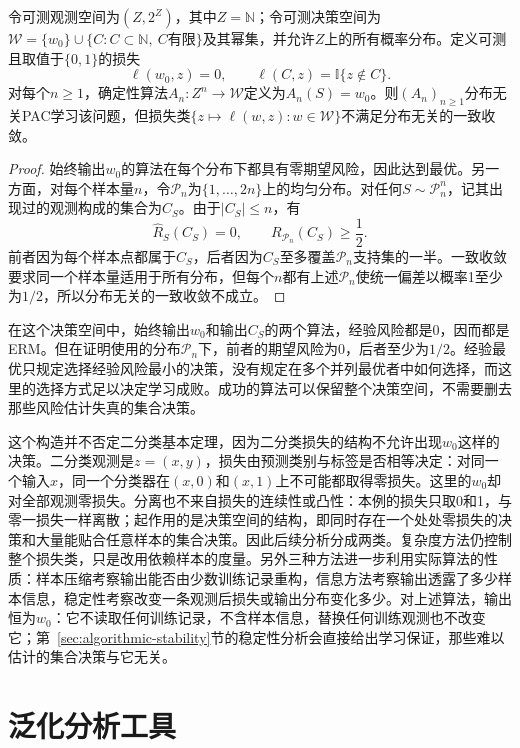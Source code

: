 \begin{theorem}[可学习性不推出一致收敛]
\label{thm:general-learning-without-uniform}
令可测观测空间为$(Z,2^Z)$，其中$Z=\mathbb N$；令可测决策空间为$\mathcal W=\{w_0\}\cup\{C:C\subset\mathbb N,\ C\text{有限}\}$及其幂集，并允许$Z$上的所有概率分布。定义可测且取值于$\{0,1\}$的损失
\[
 \ell(w_0,z)=0,\qquad
 \ell(C,z)=\mathbb I\{z\notin C\}.
\]
对每个$n\geq1$，确定性算法$A_n:Z^n\to\mathcal W$定义为$A_n(S)=w_0$。则$(A_n)_{n\geq1}$分布无关PAC学习该问题，但损失类$\{z\mapsto\ell(w,z):w\in\mathcal W\}$不满足分布无关的一致收敛。
\end{theorem}
\begin{proof}
始终输出$w_0$的算法在每个分布下都具有零期望风险，因此达到最优。另一方面，对每个样本量$n$，令$\mathcal P_n$为$\{1,\ldots,2n\}$上的均匀分布。对任何$S\sim\mathcal P_n^n$，记其出现过的观测构成的集合为$C_S$。由于$|C_S|\leq n$，有
\[
 \hat R_S(C_S)=0,\qquad R_{\mathcal P_n}(C_S)\geq\frac12.
\]
前者因为每个样本点都属于$C_S$，后者因为$C_S$至多覆盖$\mathcal P_n$支持集的一半。一致收敛要求同一个样本量适用于所有分布，但每个$n$都有上述$\mathcal P_n$使统一偏差以概率1至少为$1/2$，所以分布无关的一致收敛不成立。
\end{proof}

在这个决策空间中，始终输出$w_0$和输出$C_S$的两个算法，经验风险都是0，因而都是ERM。但在证明使用的分布$\mathcal P_n$下，前者的期望风险为0，后者至少为$1/2$。经验最优只规定选择经验风险最小的决策，没有规定在多个并列最优者中如何选择，而这里的选择方式足以决定学习成败。成功的算法可以保留整个决策空间，不需要删去那些风险估计失真的集合决策。

这个构造并不否定二分类基本定理，因为二分类损失的结构不允许出现$w_0$这样的决策。二分类观测是$z=(x,y)$，损失由预测类别与标签是否相等决定：对同一个输入$x$，同一个分类器在$(x,0)$和$(x,1)$上不可能都取得零损失。这里的$w_0$却对全部观测零损失。分离也不来自损失的连续性或凸性：本例的损失只取0和1，与零一损失一样离散；起作用的是决策空间的结构，即同时存在一个处处零损失的决策和大量能贴合任意样本的集合决策。因此后续分析分成两类。复杂度方法仍控制整个损失类，只是改用依赖样本的度量。另外三种方法进一步利用实际算法的性质：样本压缩考察输出能否由少数训练记录重构，信息方法考察输出透露了多少样本信息，稳定性考察改变一条观测后损失或输出分布变化多少。对上述算法，输出恒为$w_0$：它不读取任何训练记录，不含样本信息，替换任何训练观测也不改变它；第~\ref{sec:algorithmic-stability}节的稳定性分析会直接给出学习保证，那些难以估计的集合决策与它无关。
\section{泛化分析工具}
\label{sec:generalization-tools}

